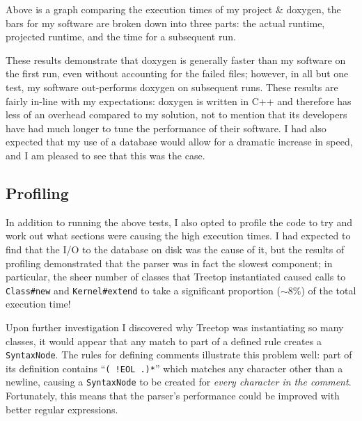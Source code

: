 \noindent{}

Above is a graph comparing the execution times of my project \& doxygen, the
bars for my software are broken down into three parts: the actual runtime,
projected runtime, and the time for a subsequent run.

These results demonstrate that doxygen is generally faster than my software on
the first run, even without accounting for the failed files; however, in all but
one test, my software out-performs doxygen on subsequent runs. These results are
fairly in-line with my expectations: doxygen is written in C++ and therefore has
less of an overhead compared to my solution, not to mention that its developers
have had much longer to tune the performance of their software. I had also
expected that my use of a database would allow for a dramatic increase in speed,
and I am pleased to see that this was the case.

  \subsection{Profiling}
  In addition to running the above tests, I also opted to profile the code to
  try and work out what sections were causing the high execution times. I had
  expected to find that the I/O to the database on disk was the cause of it, but
  the results of profiling demonstrated that the parser was in fact the slowest
  component; in particular, the sheer number of classes that Treetop
  instantiated caused calls to \lstinline|Class#new| and
  \lstinline|Kernel#extend| to take a significant proportion ($\sim$8\%) of the
  total execution time!

  Upon further investigation I discovered why Treetop was instantiating so
  many classes, it would appear that any match to part of a defined rule
  creates a \lstinline|SyntaxNode|. The rules for defining comments illustrate
  this problem well: part of its definition contains ``\lstinline|( !EOL .)*|''
  which matches any character other than a newline, causing a
  \lstinline|SyntaxNode| to be created for \emph{every character in the
  comment}. Fortunately, this means that the parser's performance could be
  improved with better regular expressions.


